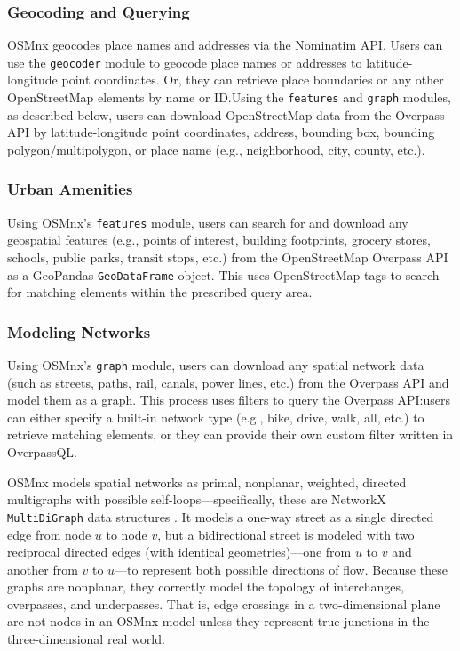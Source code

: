 \documentclass[12pt,letterpaper]{article} %
\begin{document}
\subsubsection{Geocoding and Querying}

OSMnx geocodes place names and addresses via the Nominatim API\@. Users can use the \texttt{geocoder} module to geocode place names or addresses to latitude-longitude point coordinates. Or, they can retrieve place boundaries or any other OpenStreetMap elements by name or ID.\@ Using the \texttt{features} and \texttt{graph} modules, as described below, users can download OpenStreetMap data from the Overpass API by latitude-longitude point coordinates, address, bounding box, bounding polygon/multipolygon, or place name (e.g., neighborhood, city, county, etc.).

\subsubsection{Urban Amenities}

Using OSMnx's \texttt{features} module, users can search for and download any geospatial features (e.g., points of interest, building footprints, grocery stores, schools, public parks, transit stops, etc.) from the OpenStreetMap Overpass API as a GeoPandas \texttt{GeoDataFrame} object. This uses OpenStreetMap tags to search for matching elements within the prescribed query area.

\subsubsection{Modeling Networks}

Using OSMnx's \texttt{graph} module, users can download any spatial network data (such as streets, paths, rail, canals, power lines, etc.) from the Overpass API and model them as a graph. This process uses filters to query the Overpass API:\@ users can either specify a built-in network type (e.g., bike, drive, walk, all, etc.) to retrieve matching elements, or they can provide their own custom filter written in OverpassQL.\@

OSMnx models spatial networks as primal, nonplanar, weighted, directed multigraphs with possible self-loops---specifically, these are NetworkX \texttt{MultiDiGraph} data structures \citep{hagberg_exploring_2008}. It models a one-way street as a single directed edge from node $u$ to node $v$, but a bidirectional street is modeled with two reciprocal directed edges (with identical geometries)---one from $u$ to $v$ and another from $v$ to $u$---to represent both possible directions of flow. Because these graphs are nonplanar, they correctly model the topology of interchanges, overpasses, and underpasses. That is, edge crossings in a two-dimensional plane are not nodes in an OSMnx model unless they represent true junctions in the three-dimensional real world.
\end{document}
